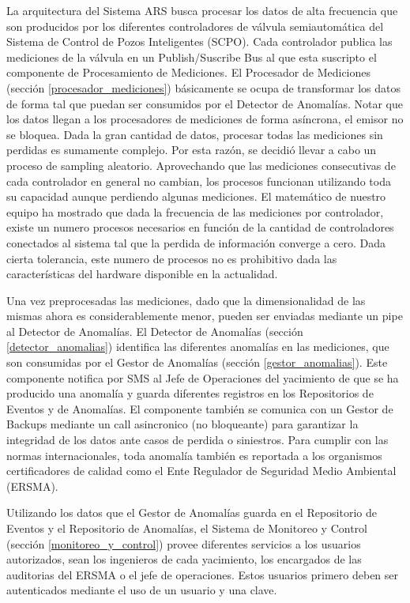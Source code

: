 \documentclass{article}
\theoremstyle{definition}
\theoremstyle{remark}
\begin{document}
La arquitectura del Sistema ARS busca procesar los datos de alta frecuencia que son producidos por los diferentes controladores de válvula semiautomática del Sistema de Control de Pozos Inteligentes (SCPO). Cada controlador publica las mediciones de la válvula en un Publish/Suscribe Bus al que esta suscripto el componente de Procesamiento de Mediciones. El Procesador de Mediciones (sección \ref{procesador_mediciones}) básicamente se ocupa de transformar los datos de forma tal que puedan ser consumidos por el Detector de Anomalías. Notar que los datos llegan a los procesadores de mediciones de forma asíncrona, el emisor no se bloquea. Dada la gran cantidad de datos, procesar todas las mediciones sin perdidas es sumamente complejo. Por esta razón, se decidió llevar a cabo un proceso de sampling aleatorio. Aprovechando que las mediciones consecutivas de cada controlador en general no cambian, los procesos funcionan utilizando toda su capacidad aunque perdiendo algunas mediciones. El matemático de nuestro equipo ha mostrado que dada la frecuencia de las mediciones por controlador, existe un numero procesos necesarios en función de la cantidad de controladores conectados al sistema tal que la perdida de información converge a cero. Dada cierta tolerancia, este numero de procesos no es prohibitivo dada las características del hardware disponible en la actualidad.

Una vez preprocesadas las mediciones, dado que la dimensionalidad de las mismas ahora es considerablemente menor, pueden ser enviadas mediante un pipe al Detector de Anomalías. El Detector de Anomalías (sección \ref{detector_anomalias}) identifica las diferentes anomalías en las mediciones, que son consumidas por el Gestor de Anomalías (sección \ref{gestor_anomalias}). Este componente notifica por SMS al Jefe de Operaciones del yacimiento de que se ha producido una anomalía y guarda diferentes registros en los Repositorios de Eventos y de Anomalías. El componente también se comunica con un Gestor de Backups mediante un call asincronico (no bloqueante) para garantizar la integridad de los datos ante casos de perdida o siniestros. Para cumplir con las normas internacionales, toda anomalía también es reportada a los organismos certificadores de calidad como el Ente Regulador de Seguridad Medio Ambiental (ERSMA). 

Utilizando los datos que el Gestor de Anomalías guarda en el Repositorio de Eventos y el Repositorio de Anomalías, el Sistema de Monitoreo y Control (sección \ref{monitoreo_y_control}) provee diferentes servicios a los usuarios autorizados, sean los ingenieros de cada yacimiento, los encargados de las auditorias del ERSMA o el jefe de operaciones. Estos usuarios primero deben ser autenticados mediante el uso de un usuario y una clave.
\end{document}
